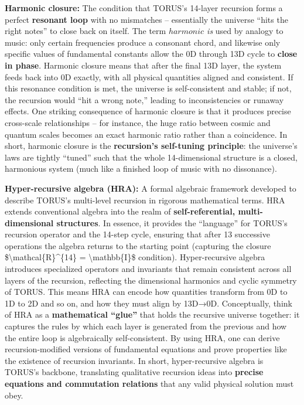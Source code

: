 \documentclass[
]{article}
\begin{document}
{\textbf{Harmonic closure:} The condition that TORUS's 14-layer recursion
forms a perfect \textbf{resonant loop} with no mismatches -- essentially
the universe ``hits the right notes'' to close back on itself. The term
\emph{$harmonic$ is} used by analogy to music: only certain frequencies
produce a consonant chord, and likewise only specific values of
fundamental constants allow the 0D through 13D cycle to \textbf{close in
phase}\hspace{0pt}. Harmonic closure means that after the final 13D
layer, the system feeds back into 0D exactly, with all physical
quantities aligned and consistent\hspace{0pt}. If this resonance
condition is met, the universe is self-consistent and stable; if not,
the recursion would ``hit a wrong note,'' leading to inconsistencies or
runaway effects. One striking consequence of harmonic closure is that it
produces precise cross-scale relationships -- for instance, the huge
ratio between cosmic and quantum scales becomes an exact harmonic ratio
rather than a coincidence\hspace{0pt}. In short, harmonic closure is the
\textbf{recursion's self-tuning principle}: the universe's laws are
tightly ``tuned'' such that the whole 14-dimensional structure is a
closed, harmonious system (much like a finished loop of music with no
dissonance).

\textbf{Hyper-recursive algebra (HRA):} A formal algebraic framework
developed to describe TORUS's multi-level recursion in rigorous
mathematical terms. HRA extends conventional algebra into the realm of
\textbf{self-referential, multi-dimensional structures}\hspace{0pt}. In
essence, it provides the ``language'' for TORUS's recursion operator and
the 14-step cycle, ensuring that after 13 successive operations the
algebra returns to the starting point (capturing the closure
\$\textbackslash mathcal\{R\}\^{}\{14\} = \textbackslash mathbb\{I\}\$
condition)\hspace{0pt}. Hyper-recursive algebra introduces specialized
operators and invariants that remain consistent across all layers of the
recursion, reflecting the dimensional harmonics and cyclic symmetry of
TORUS\hspace{0pt}. This means HRA can encode how quantities transform
from 0D to 1D to 2D and so on, and how they must align by 13D→0D.
Conceptually, think of HRA as a \textbf{mathematical ``glue''} that
holds the recursive universe together: it captures the rules by which
each layer is generated from the previous and how the entire loop is
algebraically self-consistent. By using HRA, one can derive
recursion-modified versions of fundamental equations and prove
properties like the existence of recursion invariants. In short,
hyper-recursive algebra is TORUS's backbone, translating qualitative
recursion ideas into \textbf{precise equations and commutation
relations} that any valid physical solution must obey.

}
\end{document}
